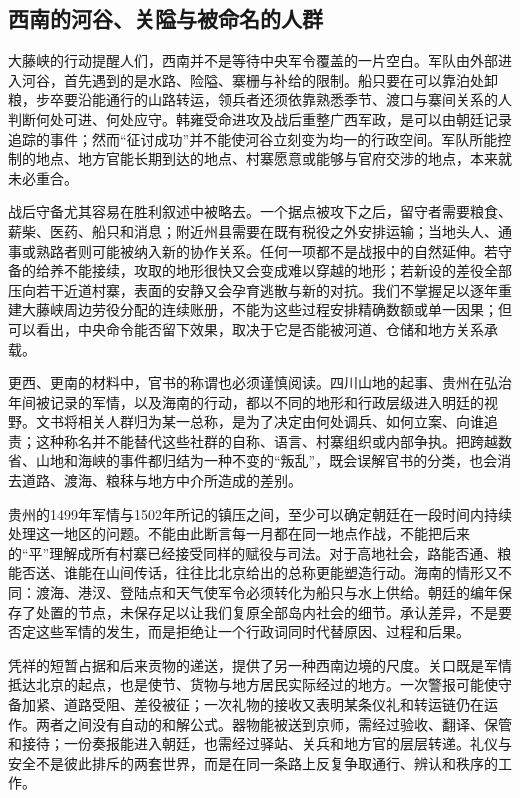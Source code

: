 \subsection{西南的河谷、关隘与被命名的人群}

大藤峡的行动提醒人们，西南并不是等待中央军令覆盖的一片空白。军队由外部进入河谷，首先遇到的是水路、险隘、寨栅与补给的限制。船只要在可以靠泊处卸粮，步卒要沿能通行的山路转运，领兵者还须依靠熟悉季节、渡口与寨间关系的人判断何处可进、何处应守。韩雍受命进攻及战后重整广西军政，是可以由朝廷记录追踪的事件；然而“征讨成功”并不能使河谷立刻变为均一的行政空间。军队所能控制的地点、地方官能长期到达的地点、村寨愿意或能够与官府交涉的地点，本来就未必重合。

战后守备尤其容易在胜利叙述中被略去。一个据点被攻下之后，留守者需要粮食、薪柴、医药、船只和消息；附近州县需要在既有税役之外安排运输；当地头人、通事或熟路者则可能被纳入新的协作关系。任何一项都不是战报中的自然延伸。若守备的给养不能接续，攻取的地形很快又会变成难以穿越的地形；若新设的差役全部压向若干近道村寨，表面的安静又会孕育逃散与新的对抗。我们不掌握足以逐年重建大藤峡周边劳役分配的连续账册，不能为这些过程安排精确数额或单一因果；但可以看出，中央命令能否留下效果，取决于它是否能被河道、仓储和地方关系承载。

更西、更南的材料中，官书的称谓也必须谨慎阅读。四川山地的起事、贵州在弘治年间被记录的军情，以及海南的行动，都以不同的地形和行政层级进入明廷的视野。文书将相关人群归为某一总称，是为了决定由何处调兵、如何立案、向谁追责；这种称名并不能替代这些社群的自称、语言、村寨组织或内部争执。把跨越数省、山地和海峡的事件都归结为一种不变的“叛乱”，既会误解官书的分类，也会消去道路、渡海、粮秣与地方中介所造成的差别。

贵州的1499年军情与1502年所记的镇压之间，至少可以确定朝廷在一段时间内持续处理这一地区的问题。不能由此断言每一月都在同一地点作战，不能把后来的“平”理解成所有村寨已经接受同样的赋役与司法。对于高地社会，路能否通、粮能否送、谁能在山间传话，往往比北京给出的总称更能塑造行动。海南的情形又不同：渡海、港汊、登陆点和天气使军令必须转化为船只与水上供给。朝廷的编年保存了处置的节点，未保存足以让我们复原全部岛内社会的细节。承认差异，不是要否定这些军情的发生，而是拒绝让一个行政词同时代替原因、过程和后果。

凭祥的短暂占据和后来贡物的递送，提供了另一种西南边境的尺度。关口既是军情抵达北京的起点，也是使节、货物与地方居民实际经过的地方。一次警报可能使守备加紧、道路受阻、差役被征；一次礼物的接收又表明某条仪礼和转运链仍在运作。两者之间没有自动的和解公式。器物能被送到京师，需经过验收、翻译、保管和接待；一份奏报能进入朝廷，也需经过驿站、关兵和地方官的层层转递。礼仪与安全不是彼此排斥的两套世界，而是在同一条路上反复争取通行、辨认和秩序的工作。

